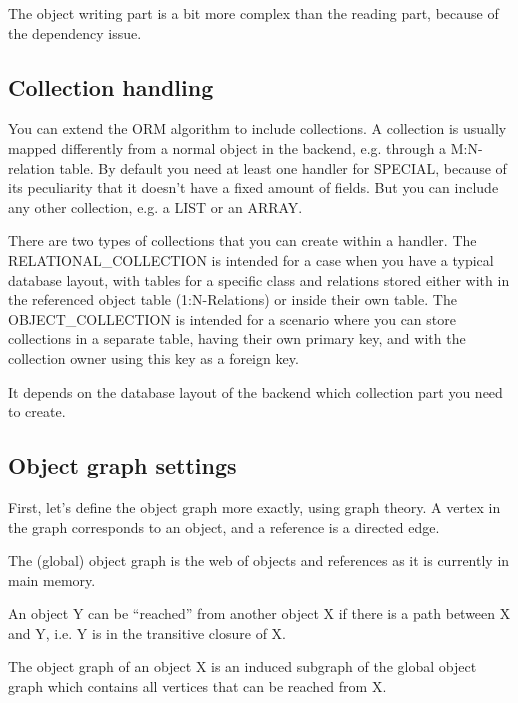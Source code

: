 The object writing part is a bit more complex than the reading part, because of the dependency issue.



\subsection{Collection handling}

You can extend the ORM algorithm to include collections. A collection is usually mapped differently from a normal object in the backend, e.g. through a M:N-relation table.
By default you need at least one handler for SPECIAL, because of its peculiarity that it doesn't have a fixed amount of fields.
But you can include any other collection, e.g. a LIST or an ARRAY.

There are two types of collections that you can create within a handler. 
The RELATIONAL\_COLLECTION is intended for a case when you have a typical database layout, with tables for a specific class and relations stored either with in the referenced object table (1:N-Relations) or inside their own table.
The OBJECT\_COLLECTION is intended for a scenario where you can store collections in a separate table, having their own primary key, and with the collection owner using this key as a foreign key.


It depends on the database layout of the backend which collection part you need to create.

\subsection{Object graph settings}

First, let's define the object graph more exactly, using graph theory.
A vertex in the graph corresponds to an object, and a reference is a directed edge.

The (global) object graph is the web of objects and references as it is currently in main memory.

An object Y can be ``reached'' from another object X if there is a path between X and Y, i.e. Y is in the transitive closure of X.

The object graph of an object X is an induced subgraph of the global object graph which contains all vertices that can be reached from X.

